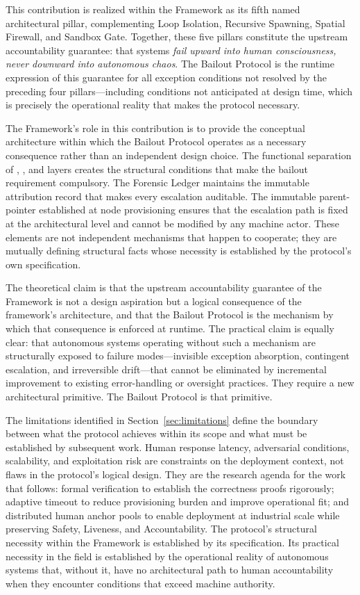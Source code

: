 This contribution is realized within the \bxthree{} Framework as its fifth named architectural pillar, complementing Loop Isolation, Recursive Spawning, Spatial Firewall, and Sandbox Gate. Together, these five pillars constitute the upstream accountability guarantee: that \bxthree{} systems \emph{fail upward into human consciousness, never downward into autonomous chaos}. The Bailout Protocol is the runtime expression of this guarantee for all exception conditions not resolved by the preceding four pillars---including conditions not anticipated at design time, which is precisely the operational reality that makes the protocol necessary.

The \bxthree{} Framework's role in this contribution is to provide the conceptual architecture within which the Bailout Protocol operates as a necessary consequence rather than an independent design choice. The functional separation of \purpose{}, \bounds{}, and \fact{} layers creates the structural conditions that make the bailout requirement compulsory. The Forensic Ledger maintains the immutable attribution record that makes every escalation auditable. The immutable parent-pointer established at node provisioning ensures that the escalation path is fixed at the architectural level and cannot be modified by any machine actor. These elements are not independent mechanisms that happen to cooperate; they are mutually defining structural facts whose necessity is established by the protocol's own specification.

The theoretical claim is that the upstream accountability guarantee of the \bxthree{} Framework is not a design aspiration but a logical consequence of the framework's architecture, and that the Bailout Protocol is the mechanism by which that consequence is enforced at runtime. The practical claim is equally clear: that autonomous systems operating without such a mechanism are structurally exposed to failure modes---invisible exception absorption, contingent escalation, and irreversible drift---that cannot be eliminated by incremental improvement to existing error-handling or oversight practices. They require a new architectural primitive. The Bailout Protocol is that primitive.

The limitations identified in Section~\ref{sec:limitations} define the boundary between what the protocol achieves within its scope and what must be established by subsequent work. Human response latency, adversarial conditions, scalability, and exploitation risk are constraints on the deployment context, not flaws in the protocol's logical design. They are the research agenda for the work that follows: formal verification to establish the correctness proofs rigorously; adaptive timeout to reduce provisioning burden and improve operational fit; and distributed human anchor pools to enable deployment at industrial scale while preserving Safety, Liveness, and Accountability. The protocol's structural necessity within the \bxthree{} Framework is established by its specification. Its practical necessity in the field is established by the operational reality of autonomous systems that, without it, have no architectural path to human accountability when they encounter conditions that exceed machine authority.


